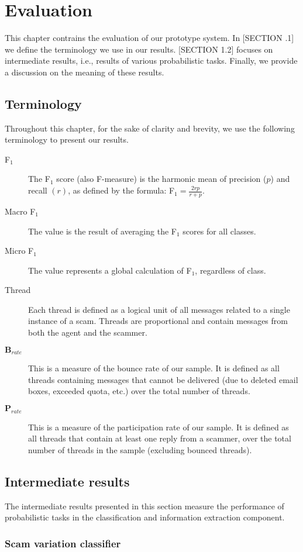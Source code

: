 \chapter{Evaluation}
This chapter contrains the evaluation of our prototype system. In [SECTION .1] we define the terminology we use in our results. [SECTION 1.2] focuses on intermediate results, i.e., results of various probabilistic tasks. Finally, we provide a discussion on the meaning of these results.

\section{Terminology}
Throughout this chapter, for the sake of clarity and brevity, we use the following terminology to present our results.
\begin{description}
\item[F$_{1}$] The F$_{1}$ score (also F-measure) is the harmonic mean of precision ($p$) and recall $(r)$, as defined by the formula: F$_{1} = \frac{2rp}{r + p}$.
\item[Macro F$_{1}$] The value is the result of averaging the F$_{1}$ scores for all classes.
\item[Micro F$_{1}$] The value represents a global calculation of F$_{1}$, regardless of class.
\item[Thread] Each thread is defined as a logical unit of all messages related to a single instance of a scam. Threads are proportional and contain messages from both the agent and the scammer.
\item[$\mathbf B_{rate}$] This is a measure of the bounce rate of our sample. It is defined as all threads containing messages that cannot be delivered (due to deleted email boxes, exceeded quota, etc.) over the total number of threads.
\item[$\mathbf P_{rate}$] This is a measure of the participation rate of our sample. It is defined as all threads that contain at least one reply from a scammer, over the total number of threads in the sample (excluding bounced threads).
\end{description}

\section{Intermediate results}
The intermediate results presented in this section measure the performance of probabilistic tasks in the classification and information extraction component.
\subsection{Scam variation classifier}

